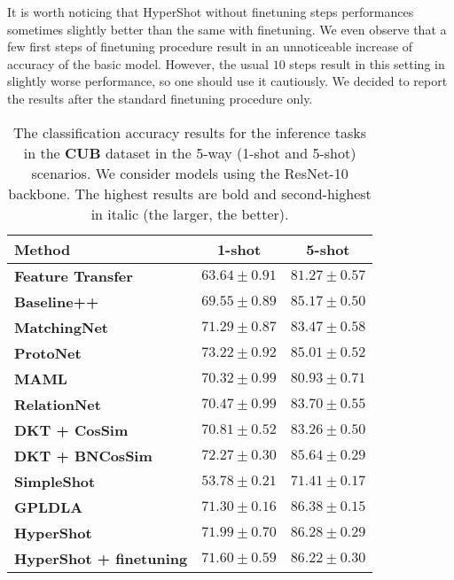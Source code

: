 \documentclass[nohyperref]{article}
\def\our{HyperShot}
\theoremstyle{plain}
\theoremstyle{definition}
\theoremstyle{remark}
\begin{document}
It is worth noticing that \our{} without finetuning steps performances sometimes slightly better than the same with finetuning. We even observe that a few first steps of finetuning procedure result in an unnoticeable increase of accuracy of the basic model. However, the usual $10$ steps result in this setting in slightly worse performance, so one should use it cautiously. We decided to report the results after the standard finetuning procedure only.


\begin{table*}[h!]
\centering
\caption{ The classification accuracy results for the inference tasks in the \textbf{CUB} dataset in the 5-way (1-shot and 5-shot) scenarios. We consider models using the ResNet-10 backbone. The highest results are bold and second-highest in italic (the larger, the better).}
\label{tab:cubresnet}
\begin{tabular}{lcc}
\toprule
\textbf{Method}    & \textbf{1-shot} & \textbf{5-shot} \\
\midrule
\textbf{Feature Transfer}    &  $63.64 \pm 0.91$ & $81.27 \pm 0.57$ \\
\textbf{Baseline++}  \cite{chen2019closer}  & $69.55 \pm 0.89$ & $85.17 \pm 0.50$  \\
\textbf{MatchingNet} \cite{vinyals2016matching}   & $71.29 \pm 0.87$ & $83.47 \pm 0.58$  \\
\textbf{ProtoNet} \cite{snell2017prototypical}   & $\mathbf{73.22 \pm 0.92}$ & $85.01 \pm 0.52$ \\
\textbf{MAML} \cite{finn2017model}   & $70.32 \pm 0.99$ & $80.93 \pm 0.71$ \\
\textbf{RelationNet}  \cite{sung2018learning}  &  $70.47  \pm 0.99 $ & $83.70 \pm 0.55$ \\
\textbf{DKT + CosSim} \cite{patacchiola2020bayesian}   & $70.81 \pm 0.52$ & $83.26 \pm 0.50$ \\
\textbf{DKT + BNCosSim} \cite{patacchiola2020bayesian}   & $\mathit{72.27 \pm 0.30}$ & $85.64 \pm 0.29$ \\
\textbf{SimpleShot} \cite{wang2019simpleshot} & $53.78 \pm 0.21$ & $71.41 \pm 0.17$ \\
\textbf{GPLDLA} \cite{kim2021gaussian} & $71.30 \pm 0.16$ & $\mathbf{86.38 \pm 0.15}$ \\
\midrule
\textbf{\our{}}   & $71.99 \pm 0.70$ & $86.28 \pm 0.29$ \\
\textbf{\our{} + finetuning}   & $71.60 \pm 0.59$ & $\mathit{86.22 \pm 0.30}$ \\
\bottomrule
\end{tabular}
\end{table*}
\end{document}
